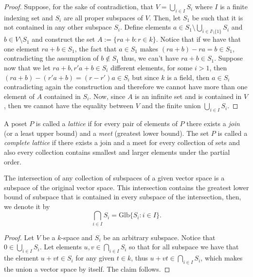 \begin{proof}
   Suppose, for the sake of contradiction, that \(V = \bigcup_{i \in  I} S_i\) 
   where \(I\) is a finite indexing set and \(S_i\) are all proper subspaces of
   \(V\). Then, let \(S_1\) be such that it is not contained in any other
   subspace \(S_i\). Define elements \(a \in S_1 \setminus \bigcup_{i \in
   I \setminus \{1\} } S_i \) and \(b \in V \setminus S_1\) and construct the
   set \(A := \{ra + b : r \in k\}\). Notice that if we have that one element
   \(ra + b \in S_1\), the fact that \(a \in S_1\) makes \((ra + b) - ra = b
   \in S_1\), contradicting the assumption of \(b \not\in S_1\) thus, we can't
   have \(ra + b \in S_1\). Suppose now that we let \(ra + b, r'a + b \in S_i\)
   different elements, for some \(i > 1\), then \((ra + b) - (r'a + b) = (r -
   r')a \in S_i\) but since \(k\) is a field, then \(a \in S_i\) contradicting
   again the construction and therefore we cannot have more than one element of
   \(A\) contained in \(S_i\). Now, since \(A\) is an infinite set and is
   contained in \(V\), then we cannot have the equality between \(V\) and the
   finite union \(\bigcup_{i \in  I} S_i\).
\end{proof}

\begin{definition}[Lattice]\label{def: lattice}
   A poset \(P\) is called a \emph{lattice} if for every pair of
   elements of \(P\) there exists a \emph{join} (or a least upper bound) and a
   \emph{meet} (greatest lower bound). The set \(P\) is called a \emph{complete
   lattice} if there exists a join and a meet for every collection of sets and
   also every collection contains smallest and larger elements under the partial
   order.
\end{definition}

\begin{proposition}\label{prop: intersection of subspaces}
   The intersection of any collection of subspaces of a given vector space is a
   subspace of the original vector space. This intersection contains the
   greatest lower bound of subspace that is contained in every subspace of the
   intersection, then, we denote it by
   \[
      \bigcap_{i \in  I} S_i = \mathrm{Glb}\{S_i : i \in I\}.
   \] 
\end{proposition}

\begin{proof}
   Let \(V\) be a \(k\)-space and \(S_i\) be an arbitrary subspace. Notice that
   \(0 \in \bigcup_{i \in  I} S_i\). Let elements \(u, v \in \bigcap_{i \in  I}
   S_i\) so that for all subspace we have that the element \(u + vt \in S_i\)
   for any given \(t \in k\), thus \(u + vt \in \bigcap_{i \in  I} S_i\), which
   makes the union a vector space by itself. The claim follows.
\end{proof}

